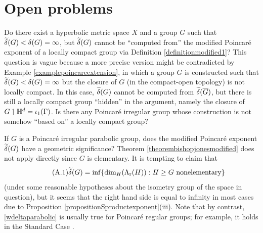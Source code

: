 

\chapter{Open problems}
\label{appendixopenproblems}


\begin{problem}
Do there exist a hyperbolic metric space $X$ and a group $G$ such that $\widetilde\delta(G) < \delta(G) = \infty$, but $\widetilde\delta(G)$ cannot be ``computed from'' the modified Poincar\'e exponent of a locally compact group via Definition \ref{definitionmodified1}? This question is vague because a more precise version might be contradicted by Example \ref{examplepoincareextension}, in which a group $G$ is constructed such that $\widetilde\delta(G) < \delta(G) = \infty$ but the closure of $G$ (in the compact-open topology) is not locally compact. In this case, $\widetilde\delta(G)$ cannot be computed from $\widetilde\delta(\overline G)$, but there is still a locally compact group ``hidden'' in the argument, namely the closure of $G\given \H^d = \iota_1(\Gamma)$. Is there any Poincar\'e irregular group whose construction is not somehow ``based on'' a locally compact group?
\end{problem}

\begin{problem}
If $G$ is a Poincar\'e irregular parabolic group, does the modified Poincar\'e exponent $\widetilde\delta(G)$ have a geometric significance? Theorem \ref{theorembishopjonesmodified} does not apply directly since $G$ is elementary. It is tempting to claim that
\begin{equation}
\label{wdeltaparabolic} \tag{A.1}
\widetilde\delta(G) = \inf\{{\dim_H}(\Lambda_{\mathrm r}(H)) : H\geq G \textup{ nonelementary}\}
\end{equation}
(under some reasonable hypotheses about the isometry group of the space in question), but it seems that the right hand side is equal to infinity in most cases due to Proposition \ref{propositionSproductexponent}(iii). Note that by contrast, \eqref{wdeltaparabolic} is usually true for Poincar\'e regular groups; for example, it holds in the Standard Case \cite{Beardon1}.
\end{problem}

